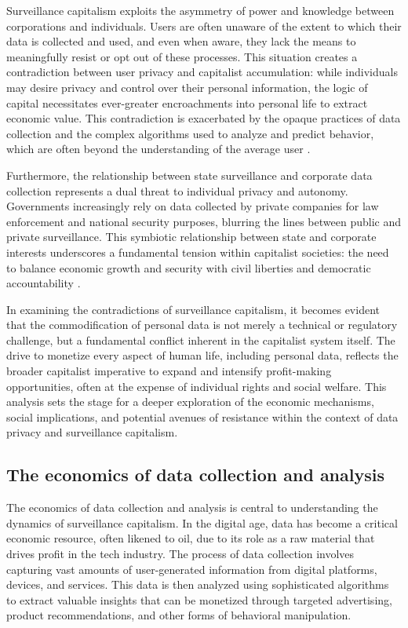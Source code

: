 \begin{refsection}
Surveillance capitalism exploits the asymmetry of power and knowledge between corporations and individuals. Users are often unaware of the extent to which their data is collected and used, and even when aware, they lack the means to meaningfully resist or opt out of these processes. This situation creates a contradiction between user privacy and capitalist accumulation: while individuals may desire privacy and control over their personal information, the logic of capital necessitates ever-greater encroachments into personal life to extract economic value. This contradiction is exacerbated by the opaque practices of data collection and the complex algorithms used to analyze and predict behavior, which are often beyond the understanding of the average user \cite[pp.~41-44]{pasquale2015black}.

Furthermore, the relationship between state surveillance and corporate data collection represents a dual threat to individual privacy and autonomy. Governments increasingly rely on data collected by private companies for law enforcement and national security purposes, blurring the lines between public and private surveillance. This symbiotic relationship between state and corporate interests underscores a fundamental tension within capitalist societies: the need to balance economic growth and security with civil liberties and democratic accountability \cite[pp.~113-116]{schneier2015data}.

In examining the contradictions of surveillance capitalism, it becomes evident that the commodification of personal data is not merely a technical or regulatory challenge, but a fundamental conflict inherent in the capitalist system itself. The drive to monetize every aspect of human life, including personal data, reflects the broader capitalist imperative to expand and intensify profit-making opportunities, often at the expense of individual rights and social welfare. This analysis sets the stage for a deeper exploration of the economic mechanisms, social implications, and potential avenues of resistance within the context of data privacy and surveillance capitalism.

\subsection{The economics of data collection and analysis}

The economics of data collection and analysis is central to understanding the dynamics of surveillance capitalism. In the digital age, data has become a critical economic resource, often likened to oil, due to its role as a raw material that drives profit in the tech industry. The process of data collection involves capturing vast amounts of user-generated information from digital platforms, devices, and services. This data is then analyzed using sophisticated algorithms to extract valuable insights that can be monetized through targeted advertising, product recommendations, and other forms of behavioral manipulation.


\end{refsection}
